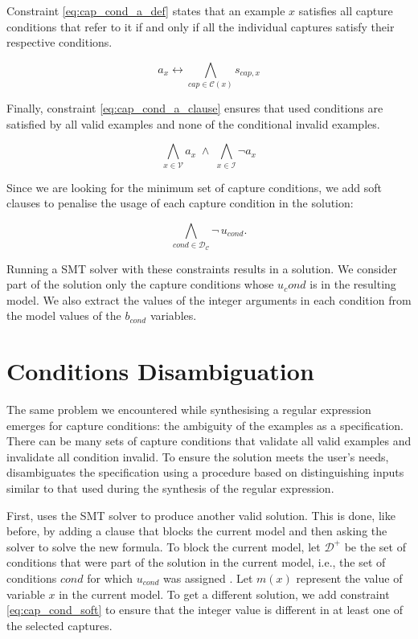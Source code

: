 Constraint \ref{eq:cap_cond_a_def} states that an example \(x\) satisfies all capture conditions that refer to it if and only if all the individual captures satisfy their respective conditions.

\begin{equation}\label{eq:cap_cond_a_def}
    a_x \leftrightarrow \bigwedge_{cap \in \mathcal{C}(x)} s_{cap,x}
\end{equation}

Finally, constraint \ref{eq:cap_cond_a_clause} ensures that used conditions are satisfied by all valid examples and none of the conditional invalid examples.

\begin{equation}\label{eq:cap_cond_a_clause}
    \bigwedge_{x \in \mathcal{V}} a_x \;\land\; \bigwedge_{x \in \mathcal{I}} \neg a_x
\end{equation}


Since we are looking for the minimum set of capture conditions, we add soft clauses to penalise the usage of each capture condition in the solution:

\begin{equation}
    \bigwedge_{cond \in \mathcal{D}_\mathcal{C}} \neg\, u_{cond}.
\end{equation}

Running a \ac{SMT} solver with these constraints results in a solution. We consider part of the solution only the capture conditions whose \(u_cond\) is \true in the resulting model. We also extract the values of the integer arguments in each condition from the model values of the \(b_{\textit{cond}}\) variables.

\section{Conditions Disambiguation}
\label{sec:cap_cond_distinguish}

The same problem we encountered while synthesising a regular expression emerges for capture conditions: the ambiguity of the examples as a specification. There can be many sets of capture conditions that validate all valid examples and invalidate all condition invalid. To ensure the solution meets the user's needs, \Forest disambiguates the specification using a procedure based on distinguishing inputs similar to that used during the synthesis of the regular expression.

First, \Forest uses the \ac{SMT} solver to produce another valid solution. This is done, like before, by adding a clause that blocks the current model and then asking the solver to solve the new formula.
%
To block the current model, let \(\mathcal{D^+}\) be the set of conditions that were part of the solution in the current model, i.e., the set of conditions \(\textit{cond}\) for which \(u_{\textit{cond}}\) was assigned \true.
Let \(m(x)\) represent the value of variable \(x\) in the current model.
To get a different solution, we add constraint \ref{eq:cap_cond_soft} to ensure that the integer value is different in at least one of the selected captures. 

